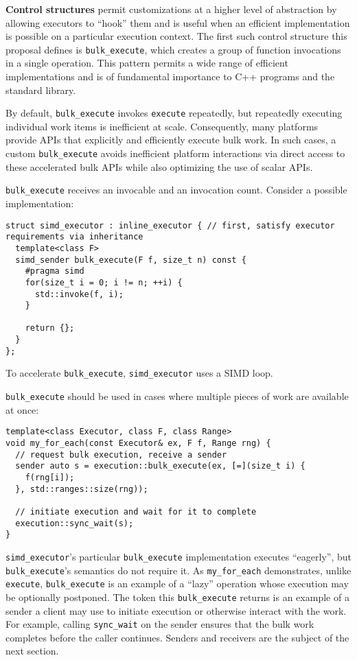 \documentclass[a4paper,12pt,notitlepage,twoside,openright]{article}
\begin{document}
\textbf{Control structures} permit customizations at a higher level of
abstraction by allowing executors to ``hook'' them and is useful when an
efficient implementation is possible on a particular execution context.
The first such control structure this proposal defines is
\texttt{bulk_execute}, which creates a group of function
invocations in a single operation. This pattern permits a wide range of
efficient implementations and is of fundamental importance to C++
programs and the standard library.

By default, \texttt{bulk_execute} invokes
\texttt{execute} repeatedly, but repeatedly executing
individual work items is inefficient at scale. Consequently, many
platforms provide APIs that explicitly and efficiently execute bulk
work. In such cases, a custom \texttt{bulk_execute} avoids
inefficient platform interactions via direct access to these accelerated
bulk APIs while also optimizing the use of scalar APIs.

\texttt{bulk_execute} receives an invocable and an
invocation count. Consider a possible implementation:

\begin{verbatim}
struct simd_executor : inline_executor { // first, satisfy executor requirements via inheritance
  template<class F>
  simd_sender bulk_execute(F f, size_t n) const {
    #pragma simd
    for(size_t i = 0; i != n; ++i) {
      std::invoke(f, i);
    }

    return {};
  }
};
\end{verbatim}

To accelerate \texttt{bulk_execute},
\texttt{simd_executor} uses a SIMD loop.

\texttt{bulk_execute} should be used in cases where multiple
pieces of work are available at once:

\begin{verbatim}
template<class Executor, class F, class Range>
void my_for_each(const Executor& ex, F f, Range rng) {
  // request bulk execution, receive a sender
  sender auto s = execution::bulk_execute(ex, [=](size_t i) {
    f(rng[i]);
  }, std::ranges::size(rng));

  // initiate execution and wait for it to complete
  execution::sync_wait(s);
}
\end{verbatim}

\texttt{simd_executor}'s particular
\texttt{bulk_execute} implementation executes ``eagerly'',
but \texttt{bulk_execute}'s semantics do not require it. As
\texttt{my_for_each} demonstrates, unlike
\texttt{execute}, \texttt{bulk_execute} is an
example of a ``lazy'' operation whose execution may be optionally
postponed. The token this \texttt{bulk_execute} returns is
an example of a sender a client may use to initiate execution or
otherwise interact with the work. For example, calling
\texttt{sync_wait} on the sender ensures that the bulk work
completes before the caller continues. Senders and receivers are the
subject of the next section.
\end{document}
